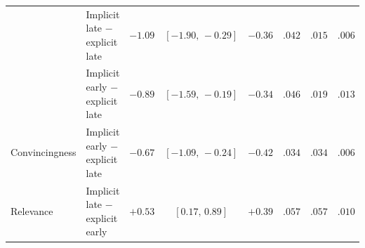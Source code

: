 \begin{table}[H]
\begin{tabular}{@{}ll r c r r r r@{}}
 & Implicit late \(-\) explicit late & $-1.09$ & $[-1.90,\,-0.29]$ & $-0.36$ & $.042$ & $.015$ & $.006$ \\
 & Implicit early \(-\) explicit late & $-0.89$ & $[-1.59,\,-0.19]$ & $-0.34$ & $.046$ & $.019$ & $.013$ \\
\addlinespace[2pt]
Convincingness & Implicit early \(-\) explicit late & $-0.67$ & $[-1.09,\,-0.24]$ & $-0.42$ & $.034$ & $.034$ & $.006$ \\
\addlinespace[2pt]
Relevance & Implicit late \(-\) explicit early & $+0.53$ & $[0.17,\,0.89]$ & $+0.39$ & $.057$ & $.057$ & $.010$ \\
\bottomrule
\end{tabular}
\end{table}
